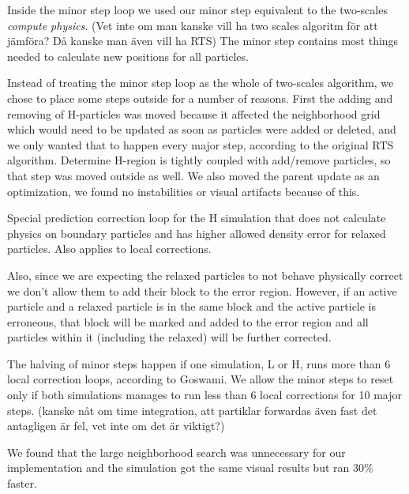 \documentclass[../../main.tex]{subfiles}
\begin{document}
Inside the minor step loop we used our minor step equivalent to the two-scales \textit{compute physics}. (Vet inte om man kanske vill ha two scales algoritm för att jämföra? Då kanske man även vill ha RTS) The minor step contains most things needed to calculate new positions for all particles. 

Instead of treating the minor step loop as the whole of two-scales algorithm, we chose to place some steps outside for a number of reasons. First the adding and removing of H-particles was moved because it affected the neighborhood grid which would need to be updated as soon as particles were added or deleted, and we only wanted that to happen every major step, according to the original RTS algorithm. Determine H-region is tightly coupled with add/remove particles, so that step was moved outside as well. We also moved the parent update as an optimization, we found no instabilities or visual artifacts because of this. 

Special prediction correction loop for the H simulation that does not calculate physics on boundary particles and has higher allowed density error for relaxed particles. Also applies to local corrections. 

Also, since we are expecting the relaxed particles to not behave physically correct we don't allow them to add their block to the error region. However, if an active particle and a relaxed particle is in the same block and the active particle is erroneous, that block will be marked and added to the error region and all particles within it (including the relaxed) will be further corrected. 

The halving of minor steps happen if one simulation, L or H, runs more than 6 local correction loops, according to Goswami. We allow the minor steps to reset only if both simulations manages to run less than 6 local corrections for 10 major steps. (kanske nåt om time integration, att partiklar forwardas även fast det antagligen är fel, vet inte om det är viktigt?)

We found that the large neighborhood search was unnecessary for our implementation and the simulation got the same visual results but ran 30\% faster. 
\end{document}
